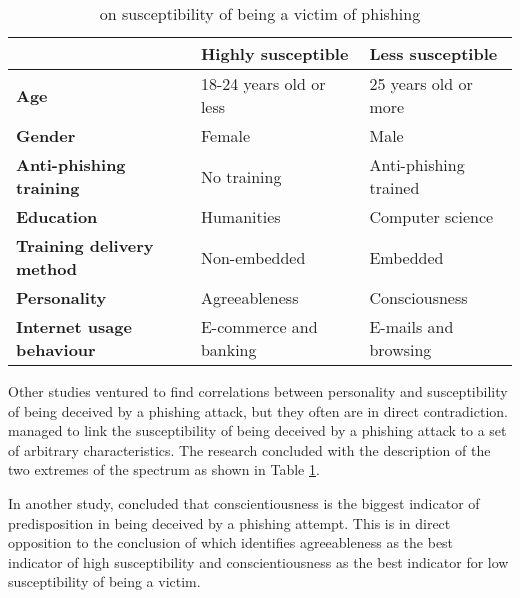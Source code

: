 \small
\begin{table}[b]
	\begin{center}
		\small
		\begin{tabular}{ | m{12em} | m{12em} | m{11.5em} | }
			\hline
			                                  & \textbf{Highly susceptible} & \textbf{Less susceptible} \\
			\hline
			\textbf{Age}                      & 18-24 years old or less     & 25 years old or more      \\
			\hline

			\textbf{Gender}                   & Female                      & Male                      \\
			\hline

			\textbf{Anti-phishing training}   & No training                 & Anti-phishing trained     \\
			\hline

			\textbf{Education}                & Humanities                  & Computer science          \\
			\hline

			\textbf{Training delivery method} & Non-embedded                & Embedded                  \\
			\hline

			\textbf{Personality}              & Agreeableness               & Consciousness             \\
			\hline

			\textbf{Internet usage behaviour} & E-commerce and banking      & E-mails and browsing      \\
			\hline
		\end{tabular}
		\caption{\cite{UNDERSTANDING_PHISHING_VICTIM} on susceptibility of being a victim of phishing}
		\label{tab:VICTIM_SUSCEPTIBILITY_BREAKDOWN}
	\end{center}
\end{table}

Other studies ventured to find correlations between personality and susceptibility of being deceived by a phishing attack, but they often are in direct contradiction. \cite{UNDERSTANDING_PHISHING_VICTIM} managed to link the susceptibility of being deceived by a phishing attack to a set of arbitrary characteristics. The research concluded with the description of the two extremes of the spectrum as shown in Table \ref{tab:VICTIM_SUSCEPTIBILITY_BREAKDOWN}.

In another study, \cite{SPEARPHISHING_IN_THE_WILD} concluded that conscientiousness is the biggest indicator of predisposition in being deceived by a phishing attempt. This is in direct opposition to the conclusion of \cite{UNDERSTANDING_PHISHING_VICTIM} which identifies agreeableness as the best indicator of high susceptibility and conscientiousness as the best indicator for low susceptibility of being a victim.

